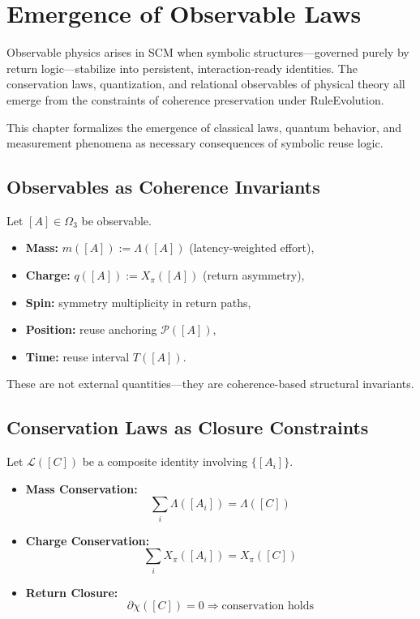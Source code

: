 \chapter{Emergence of Observable Laws} \label{chapter-observable-laws}

Observable physics arises in SCM when symbolic structures—governed purely by return logic—stabilize into persistent, interaction-ready identities. The conservation laws, quantization, and relational observables of physical theory all emerge from the constraints of coherence preservation under RuleEvolution.

This chapter formalizes the emergence of classical laws, quantum behavior, and measurement phenomena as necessary consequences of symbolic reuse logic.

\section{Observables as Coherence Invariants} \label{sec:observables}

Let $[A] \in \Omega_3$ be observable.

\begin{itemize}
  \item \textbf{Mass:} $m([A]) := \Lambda([A])$ (latency-weighted effort),
  \item \textbf{Charge:} $q([A]) := X_\pi([A])$ (return asymmetry),
  \item \textbf{Spin:} symmetry multiplicity in return paths,
  \item \textbf{Position:} reuse anchoring $\mathcal{P}([A])$,
  \item \textbf{Time:} reuse interval $T([A])$.
\end{itemize}

These are not external quantities—they are coherence-based structural invariants.

\section{Conservation Laws as Closure Constraints} \label{sec:conservation}

Let $\mathcal{L}([C])$ be a composite identity involving $\{[A_i]\}$.

\begin{itemize}
  \item \textbf{Mass Conservation:}
  \[
  \sum_i \Lambda([A_i]) = \Lambda([C])
  \]
  \item \textbf{Charge Conservation:}
  \[
  \sum_i X_\pi([A_i]) = X_\pi([C])
  \]
  \item \textbf{Return Closure:}
  \[
  \partial\chi([C]) = 0 \Rightarrow \text{conservation holds}
  \]
\end{itemize}

